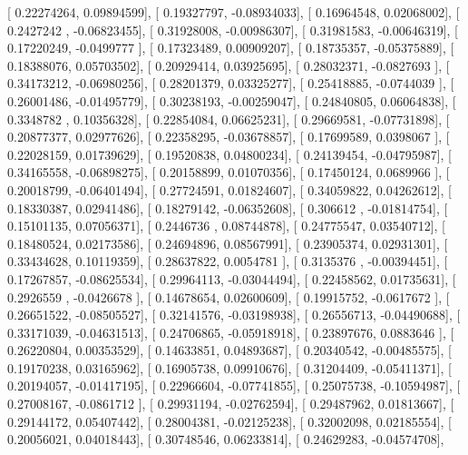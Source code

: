 \documentclass{article}
\begin{document}
       [ 0.22274264,  0.09894599],
       [ 0.19327797, -0.08934033],
       [ 0.16964548,  0.02068002],
       [ 0.2427242 , -0.06823455],
       [ 0.31928008, -0.00986307],
       [ 0.31981583, -0.00646319],
       [ 0.17220249, -0.0499777 ],
       [ 0.17323489,  0.00909207],
       [ 0.18735357, -0.05375889],
       [ 0.18388076,  0.05703502],
       [ 0.20929414,  0.03925695],
       [ 0.28032371, -0.0827693 ],
       [ 0.34173212, -0.06980256],
       [ 0.28201379,  0.03325277],
       [ 0.25418885, -0.0744039 ],
       [ 0.26001486, -0.01495779],
       [ 0.30238193, -0.00259047],
       [ 0.24840805,  0.06064838],
       [ 0.3348782 ,  0.10356328],
       [ 0.22854084,  0.06625231],
       [ 0.29669581, -0.07731898],
       [ 0.20877377,  0.02977626],
       [ 0.22358295, -0.03678857],
       [ 0.17699589,  0.0398067 ],
       [ 0.22028159,  0.01739629],
       [ 0.19520838,  0.04800234],
       [ 0.24139454, -0.04795987],
       [ 0.34165558, -0.06898275],
       [ 0.20158899,  0.01070356],
       [ 0.17450124,  0.0689966 ],
       [ 0.20018799, -0.06401494],
       [ 0.27724591,  0.01824607],
       [ 0.34059822,  0.04262612],
       [ 0.18330387,  0.02941486],
       [ 0.18279142, -0.06352608],
       [ 0.306612  , -0.01814754],
       [ 0.15101135,  0.07056371],
       [ 0.2446736 ,  0.08744878],
       [ 0.24775547,  0.03540712],
       [ 0.18480524,  0.02173586],
       [ 0.24694896,  0.08567991],
       [ 0.23905374,  0.02931301],
       [ 0.33434628,  0.10119359],
       [ 0.28637822,  0.0054781 ],
       [ 0.3135376 , -0.00394451],
       [ 0.17267857, -0.08625534],
       [ 0.29964113, -0.03044494],
       [ 0.22458562,  0.01735631],
       [ 0.2926559 , -0.0426678 ],
       [ 0.14678654,  0.02600609],
       [ 0.19915752, -0.0617672 ],
       [ 0.26651522, -0.08505527],
       [ 0.32141576, -0.03198938],
       [ 0.26556713, -0.04490688],
       [ 0.33171039, -0.04631513],
       [ 0.24706865, -0.05918918],
       [ 0.23897676,  0.0883646 ],
       [ 0.26220804,  0.00353529],
       [ 0.14633851,  0.04893687],
       [ 0.20340542, -0.00485575],
       [ 0.19170238,  0.03165962],
       [ 0.16905738,  0.09910676],
       [ 0.31204409, -0.05411371],
       [ 0.20194057, -0.01417195],
       [ 0.22966604, -0.07741855],
       [ 0.25075738, -0.10594987],
       [ 0.27008167, -0.0861712 ],
       [ 0.29931194, -0.02762594],
       [ 0.29487962,  0.01813667],
       [ 0.29144172,  0.05407442],
       [ 0.28004381, -0.02125238],
       [ 0.32002098,  0.02185554],
       [ 0.20056021,  0.04018443],
       [ 0.30748546,  0.06233814],
       [ 0.24629283, -0.04574708],
\end{document}
